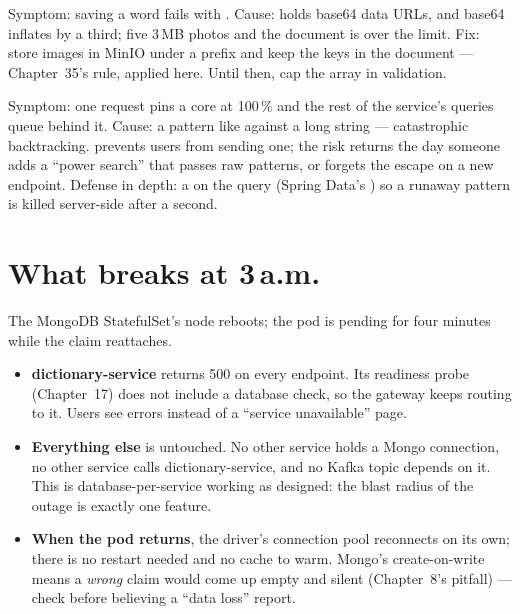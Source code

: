 \begin{pitfall}
Symptom: saving a word fails with
.
Cause:  holds base64 data URLs, and base64 inflates by a
third; five 3\,MB photos and the document is over the limit. Fix: store
images in MinIO under a  prefix
and keep the keys in the document --- Chapter~35's rule, applied here.
Until then, cap the array in  validation.
\end{pitfall}

\begin{pitfall}
Symptom: one request pins a core at 100\,\% and the rest of the
service's queries queue behind it. Cause: a pattern like
 against a long string --- catastrophic backtracking.
 prevents users from sending one; the risk returns
the day someone adds a ``power search'' that passes raw patterns, or
forgets the escape on a new endpoint. Defense in depth: a
 on the query (Spring Data's )
so a runaway pattern is killed server-side after a second.
\end{pitfall}

\section{What breaks at 3\,a.m.}

The MongoDB StatefulSet's node reboots; the pod is pending for four
minutes while the claim reattaches.

\begin{itemize}
  \item \textbf{dictionary-service} returns 500 on every endpoint. Its
  readiness probe (Chapter~17) does not include a database check, so
  the gateway keeps routing to it. Users see errors instead of a
  ``service unavailable'' page.
  \item \textbf{Everything else} is untouched. No other service holds a
  Mongo connection, no other service calls dictionary-service, and no
  Kafka topic depends on it. This is database-per-service working as
  designed: the blast radius of the outage is exactly one feature.
  \item \textbf{When the pod returns}, the driver's connection pool
  reconnects on its own; there is no restart needed and no cache to
  warm. Mongo's create-on-write means a \emph{wrong} claim would come up
  empty and silent (Chapter~8's pitfall) --- check 
  before believing a ``data loss'' report.
\end{itemize}

